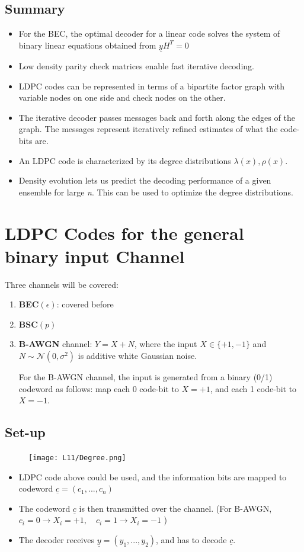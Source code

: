 \documentclass[12pt]{article}
\newcommand{\sigd}{\sigma^2}
\begin{document}
\subsection{Summary}
\begin{itemize}
    \item For the BEC, the optimal decoder for a linear code solves the system of binary linear equations obtained from $\underline{y}H^T=0$
    \item Low density parity check matrices enable fast iterative decoding.
    \item LDPC codes can be represented in terms of a bipartite factor graph with variable nodes on one side and check nodes on the other. 
    \item The iterative decoder passes messages back and forth along the edges of the graph. The messages represent iteratively refined estimates of what the code-bits are.
    \item An LDPC code is characterized by its degree distributions $\lambda(x),\rho(x)$.
    \item Density evolution lets us predict the decoding performance of a given ensemble for large \textit{n}. This can be used to optimize the degree distributions. 
\end{itemize}
\section{LDPC Codes for the general binary input Channel}
Three channels will be covered:
\begin{enumerate}
    \item \textbf{BEC}$(\epsilon)$: covered before
    \item \textbf{BSC}$(p)$
    \item \textbf{B-AWGN} channel: $Y=X+N$, where the input $X\in \{+1,-1 \}$ and $N \sim \mathcal{N}(0,\sigd)$ is additive white Gaussian noise.
    
    For the B-AWGN channel, the input is generated from a binary (0/1) codeword as follows: map each 0 code-bit to $X=+1$, and each 1 code-bit to $X=-1$.
\end{enumerate}
\subsection{Set-up}
\begin{figure}[H]
    \centering
    \texttt{[image: L11/Degree.png]}
\end{figure}
\begin{itemize}
    \item LDPC code above could be used, and the information bits are mapped to codeword $\underline{c} = (c_1,...,c_n)$
    \item The codeword $\underline{c}$ is then transmitted over the channel. (For B-AWGN, $c_i=0\rightarrow X_i=+1 ,\quad c_i=1\rightarrow X_i=-1$ )
    \item The decoder receives $\underline{y}=(y_1,...,y_2)$, and has to decode $\underline{c}$.
\end{itemize}
\end{document}
